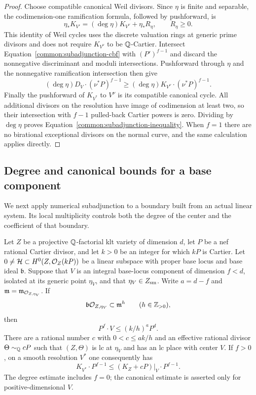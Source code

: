 \begin{proof}
Choose compatible canonical Weil divisors. Since $\eta$ is finite
and separable, the codimension-one ramification formula, followed
by pushforward, is
\[
 \eta_*K_{V'}=(\deg\eta)K_{V^\nu}+\eta_*R_\eta,
 \qquad R_\eta\geq0.
\]
This identity of Weil cycles uses the discrete valuation rings at
generic prime divisors and does not require $K_{V^\nu}$ to be
$\mathbb{Q}$-Cartier. Intersect Equation~\eqref{common:subadjunction-cbf} with
$(P')^{f-1}$ and discard the nonnegative discriminant and moduli
intersections. Pushforward through $\eta$ and the nonnegative
ramification intersection then give
\[
 (\deg\eta)D_V\cdot(\nu^*P)^{f-1}
 \geq(\deg\eta)K_{V^\nu}\cdot(\nu^*P)^{f-1}.
\]
Finally the pushforward of $K_{V^*}$ to $V^\nu$ is its compatible
canonical cycle. All additional divisors on the resolution have
image of codimension at least two, so their intersection with
$f-1$ pulled-back Cartier powers is zero. Dividing by
$\deg\eta$ proves Equation~\eqref{common:subadjunction-inequality}. When $f=1$
there are no birational exceptional divisors on the normal curve,
and the same calculation applies directly.
\end{proof}

\subsection{Degree and canonical bounds for a base component}

We next apply numerical subadjunction to a boundary built from an
actual linear system. Its local multiplicity controls both the
degree of the center and the coefficient of that boundary.

\begin{lemma}
\label{common:base-component}
Let $Z$ be a projective $\mathbb{Q}$-factorial klt variety of dimension $d$,
let $P$ be a nef rational Cartier divisor, and let $k>0$ be an
integer for which $kP$ is Cartier. Let
$0\ne\mathcal H\subset H^0(Z,\mathcal{O}_Z(kP))$ be a linear subspace
with proper base locus and base ideal $\mathfrak b$.
Suppose that $V$ is an integral base-locus component of dimension
$f<d$, isolated at its generic point $\eta_V$, and that
$\eta_V\in Z_{\rm sm}$. Write $a=d-f$ and
$\mathfrak m=\mathfrak m_{\mathcal{O}_{Z,\eta_V}}$. If
\[
 \mathfrak b\mathcal{O}_{Z,\eta_V}\subset\mathfrak m^h
 \qquad(h\in\mathbb{Z}_{>0}),
\]
then
\begin{equation}
\label{common:base-component-degree}
 P^f\cdot V\leq (k/h)^aP^d.
\end{equation}
There are a rational number $c$ with $0<c\leq ak/h$ and an
effective rational divisor $\Theta\sim_{\mathbb{Q}}cP$ such that
$(Z,\Theta)$ is lc at $\eta_V$ and has an lc place with center
$V$. If $f>0$, on a smooth resolution $V^*$ one consequently has
\begin{equation}
\label{common:base-component-canonical}
 K_{V^*}\cdot P^{f-1}
 \leq (K_Z+cP)|_V\cdot P^{f-1}.
\end{equation}
The degree estimate includes $f=0$; the canonical estimate is
asserted only for positive-dimensional $V$.
\end{lemma}


